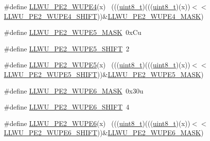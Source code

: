\begin{DoxyCompactItemize}
\#define \hyperlink{group___l_l_w_u___register___masks_ga66bcf97ee2fda285ac3a24ba5cc0b1a1}{L\+L\+W\+U\+\_\+\+P\+E2\+\_\+\+W\+U\+P\+E4}(x)                                            ~(((\hyperlink{_p_e___types_8h_aba7bc1797add20fe3efdf37ced1182c5}{uint8\+\_\+t})(((\hyperlink{_p_e___types_8h_aba7bc1797add20fe3efdf37ced1182c5}{uint8\+\_\+t})(x))$<$$<$\hyperlink{group___l_l_w_u___register___masks_ga12aa6ffb998e5273a8dd548ac434ad41}{L\+L\+W\+U\+\_\+\+P\+E2\+\_\+\+W\+U\+P\+E4\+\_\+\+S\+H\+I\+FT}))\&\hyperlink{group___l_l_w_u___register___masks_ga94128d26c60f13d22acf47200f4f37e0}{L\+L\+W\+U\+\_\+\+P\+E2\+\_\+\+W\+U\+P\+E4\+\_\+\+M\+A\+SK})
\item 
\#define \hyperlink{group___l_l_w_u___register___masks_gacfb855231e7a1c11c64d8b4e951817be}{L\+L\+W\+U\+\_\+\+P\+E2\+\_\+\+W\+U\+P\+E5\+\_\+\+M\+A\+SK}~0x\+Cu
\item 
\#define \hyperlink{group___l_l_w_u___register___masks_ga4e823ada9bfc21dca4729eedf4e63778}{L\+L\+W\+U\+\_\+\+P\+E2\+\_\+\+W\+U\+P\+E5\+\_\+\+S\+H\+I\+FT}~2
\item 
\#define \hyperlink{group___l_l_w_u___register___masks_gac3a8a230033b46633beb6b1ddb282bfd}{L\+L\+W\+U\+\_\+\+P\+E2\+\_\+\+W\+U\+P\+E5}(x)                                            ~(((\hyperlink{_p_e___types_8h_aba7bc1797add20fe3efdf37ced1182c5}{uint8\+\_\+t})(((\hyperlink{_p_e___types_8h_aba7bc1797add20fe3efdf37ced1182c5}{uint8\+\_\+t})(x))$<$$<$\hyperlink{group___l_l_w_u___register___masks_ga4e823ada9bfc21dca4729eedf4e63778}{L\+L\+W\+U\+\_\+\+P\+E2\+\_\+\+W\+U\+P\+E5\+\_\+\+S\+H\+I\+FT}))\&\hyperlink{group___l_l_w_u___register___masks_gacfb855231e7a1c11c64d8b4e951817be}{L\+L\+W\+U\+\_\+\+P\+E2\+\_\+\+W\+U\+P\+E5\+\_\+\+M\+A\+SK})
\item 
\#define \hyperlink{group___l_l_w_u___register___masks_ga0db50e96153e1ca74874da97d1c22f41}{L\+L\+W\+U\+\_\+\+P\+E2\+\_\+\+W\+U\+P\+E6\+\_\+\+M\+A\+SK}~0x30u
\item 
\#define \hyperlink{group___l_l_w_u___register___masks_gaa7a0191eaf60166333a8bee953239c85}{L\+L\+W\+U\+\_\+\+P\+E2\+\_\+\+W\+U\+P\+E6\+\_\+\+S\+H\+I\+FT}~4
\item 
\#define \hyperlink{group___l_l_w_u___register___masks_gad35ab3e8d69e872723948df07a8ba2c9}{L\+L\+W\+U\+\_\+\+P\+E2\+\_\+\+W\+U\+P\+E6}(x)                                            ~(((\hyperlink{_p_e___types_8h_aba7bc1797add20fe3efdf37ced1182c5}{uint8\+\_\+t})(((\hyperlink{_p_e___types_8h_aba7bc1797add20fe3efdf37ced1182c5}{uint8\+\_\+t})(x))$<$$<$\hyperlink{group___l_l_w_u___register___masks_gaa7a0191eaf60166333a8bee953239c85}{L\+L\+W\+U\+\_\+\+P\+E2\+\_\+\+W\+U\+P\+E6\+\_\+\+S\+H\+I\+FT}))\&\hyperlink{group___l_l_w_u___register___masks_ga0db50e96153e1ca74874da97d1c22f41}{L\+L\+W\+U\+\_\+\+P\+E2\+\_\+\+W\+U\+P\+E6\+\_\+\+M\+A\+SK})
$$
\end{DoxyCompactItemize}
